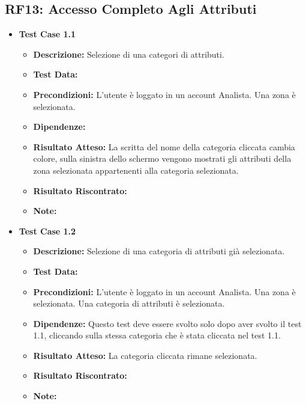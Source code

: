     \subsection{RF13: Accesso Completo Agli Attributi}
        \begin{itemize}
            \item \textbf{Test Case 1.1}
                \begin{itemize}
                    \item \textbf{Descrizione:} Selezione di una categori di attributi.
                    \item \textbf{Test Data:}
                    \item \textbf{Precondizioni:} L'utente è loggato in un account Analista. Una zona è selezionata.
                    \item \textbf{Dipendenze:}
                    \item \textbf{Risultato Atteso:} La scritta del nome della categoria cliccata cambia colore, sulla sinistra dello schermo vengono mostrati gli attributi della zona selezionata appartenenti alla categoria selezionata.
                    \item \textbf{Risultato Riscontrato:}
                    \item \textbf{Note:}
                \end{itemize}
            \item \textbf{Test Case 1.2}
                \begin{itemize}
                    \item \textbf{Descrizione:} Selezione di una categoria di attributi già selezionata.
                    \item \textbf{Test Data:}
                    \item \textbf{Precondizioni:} L'utente è loggato in un account Analista. Una zona è selezionata. Una categoria di attributi è selezionata.
                    \item \textbf{Dipendenze:} Questo test deve essere svolto solo dopo aver svolto il test 1.1, cliccando sulla stessa categoria che è stata cliccata nel test 1.1.
                    \item \textbf{Risultato Atteso:} La categoria cliccata rimane selezionata.
                    \item \textbf{Risultato Riscontrato:}
                    \item \textbf{Note:}
                \end{itemize}
        \end{itemize}